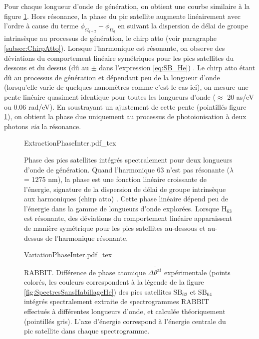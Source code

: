 Pour chaque longueur d'onde de génération, on obtient une courbe similaire à la figure \ref{fig:ExtractionPhaseInter}. Hors résonance, la phase du pic satellite augmente linéairement avec l'ordre à cause du terme $\phi_{\Omega_{q+2}} - \phi_{\Omega_{q}}$ en suivant la dispersion de délai de groupe intrinsèque au processus de génération, le chirp atto (voir paragraphe \ref{subsec:ChirpAtto}). Lorsque l'harmonique est résonante, on observe des déviations du comportement linéaire symétriques pour les pics satellites du dessous et du dessus (dû au $\pm$ dans l'expression \ref{eq:SB_He}) . Le chirp atto étant dû au processus de génération et dépendant peu de la longueur d'onde (lorsqu'elle varie de quelques nanomètres comme c'est le cas ici), on mesure une pente linéaire quasiment identique pour toutes les longueurs d'onde ($\approx$ 20 as/eV ou 0.06 rad/eV). En soustrayant un ajustement de cette pente (pointillés figure \ref{fig:ExtractionPhaseInter}), on obtient la phase due uniquement au processus de photoionisation à deux photons \textit{via} la résonance.

\begin{figure}
\centering
\def\svgwidth{\textwidth}
{ExtractionPhaseInter.pdf_tex}
\caption{Phase des pics satellites intégrés spectralement pour deux longueurs d'onde de génération. Quand l'harmonique 63 n'est pas résonante ($\lambda$ = 1275 nm), la phase est une fonction linéaire croissante de l'énergie, signature de la dispersion de délai de groupe intrinsèque aux harmoniques (chirp atto) . Cette phase linéaire dépend peu de l'énergie dans la gamme de longueurs d'onde explorées. Lorsque $\text{H}_{63}$ est résonante, des déviations du comportement linéaire apparaissent de manière symétrique pour les pics satellites au-dessous et au-dessus de l'harmonique résonante.}
\label{fig:ExtractionPhaseInter}
\end{figure}

\begin{figure}
\centering
\def\svgwidth{\textwidth}
{VariationPhaseInter.pdf_tex}
\caption{RABBIT. Différence de phase atomique $\bar{\Delta \theta^{\text{at}}}$ expérimentale (points colorés, les couleurs correspondent à la légende de la figure \ref{fig:SpectresSansHabillageHe}) des pics satellites $\text{SB}_{62}$ et $\text{SB}_{64}$ intégrés spectralement extraite de spectrogrammes RABBIT effectués à différentes longueurs d'onde, et calculée théoriquement (pointillés gris). L'axe d'énergie correspond à l'énergie centrale du pic satellite dans chaque spectrogramme.}
\label{fig:VariationPhaseInter}
\end{figure}

